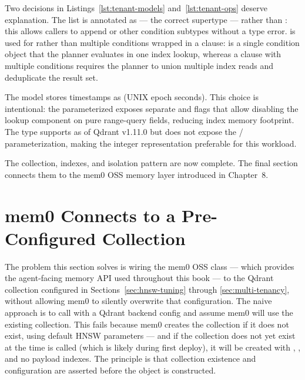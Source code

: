 Two decisions in Listings~\ref{lst:tenant-models} and~\ref{lst:tenant-ops}
deserve explanation. The  list is annotated as
 --- the correct supertype --- rather than
: this allows callers to append
 or other condition subtypes without a type
error.  is used for
 rather than multiple  conditions
wrapped in a  clause:  is a single condition
object that the planner evaluates in one index lookup, whereas a 
clause with multiple conditions requires the planner to union multiple index
reads and deduplicate the result set.

\begin{notebox}
The  model stores timestamps as  (UNIX epoch
seconds). This choice is intentional: the parameterized 
exposes separate  and  flags that allow disabling
the lookup component on pure range-query fields, reducing index memory
footprint. The  type supports 
as of Qdrant v1.11.0 but does not expose the /
parameterization, making the integer representation preferable for this
workload.
\end{notebox}

The collection, indexes, and isolation pattern are now complete. The final
section connects them to the mem0 OSS memory layer introduced in Chapter~8.


\section{mem0 Connects to a Pre-Configured Collection}
\label{sec:mem0-backend}

The problem this section solves is wiring the mem0 OSS  class
--- which provides the agent-facing memory API used throughout this book ---
to the Qdrant collection configured in Sections~\ref{sec:hnsw-tuning}
through \ref{sec:multi-tenancy}, without allowing mem0 to silently overwrite
that configuration. The naive approach is to call 
with a Qdrant backend config and assume mem0 will use the existing collection.
This fails because mem0 creates the collection if it does not exist, using
default HNSW parameters --- and if the collection does not yet exist at the
time  is called (which is likely during first deploy),
it will be created with , , and no payload
indexes. The principle is that collection existence and configuration are
asserted before the  object is constructed.

